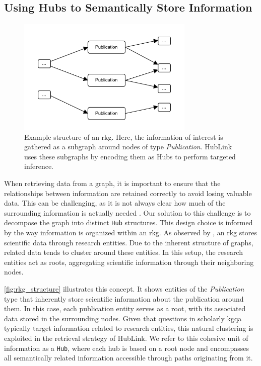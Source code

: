 \subsection{Using Hubs to Semantically Store Information}

\begin{figure}[t]
    \centering
    \includegraphics[width=0.75\textwidth]{figures/figures-RKG_structure.drawio.pdf}
    \caption[Example Structure of an RKG]{Example structure of an \gls{rkg}. Here, the information of interest is gathered as a subgraph around nodes of type \emph{Publication}. HubLink uses these subgraphs by encoding them as Hubs to perform targeted inference.}
    \label{fig:rkg_structure}
\end{figure}

When retrieving data from a graph, it is important to ensure that the relationships between information are retained correctly to avoid losing valuable data. This can be challenging, as it is not always clear how much of the surrounding information is actually needed \cite{peng_graph_2024,hu_grag_2024}. Our solution to this challenge is to decompose the graph into distinct \texttt{Hub} structures. This design choice is informed by the way information is organized within an \gls{rkg}. As observed by \textcite{verma_scholarly_2023}, an \gls{rkg} stores scientific data through research entities. Due to the inherent structure of graphs, related data tends to cluster around these entities. In this setup, the research entities act as roots, aggregating scientific information through their neighboring nodes. 

\autoref{fig:rkg_structure} illustrates this concept. It shows entities of the \emph{Publication} type that inherently store scientific information about the publication around them. In this case, each publication entity serves as a root, with its associated data stored in the surrounding nodes. Given that questions in scholarly \gls{kgqa} typically target information related to research entities, this natural clustering is exploited in the retrieval strategy of HubLink. We refer to this cohesive unit of information as a \texttt{Hub}, where each hub is based on a root node and encompasses all semantically related information accessible through paths originating from it.

